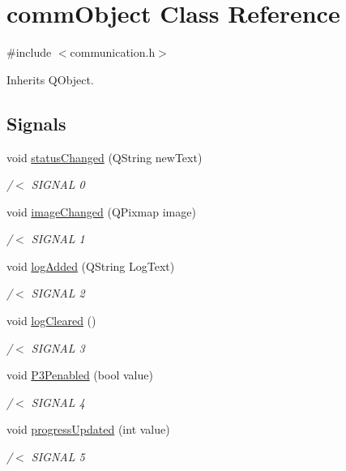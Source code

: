 \hypertarget{classcomm_object}{}\section{comm\+Object Class Reference}
\label{classcomm_object}


{\ttfamily \#include $<$communication.\+h$>$}



Inherits Q\+Object.

\subsection*{Signals}
\begin{DoxyCompactItemize}
\item 
void \hyperlink{classcomm_object_adccf5b5946d35d5cf6d76f367f93e335}{status\+Changed} (Q\+String new\+Text)
\begin{DoxyCompactList}\small\item\em /$<$ S\+I\+G\+N\+AL 0 \end{DoxyCompactList}\item 
void \hyperlink{classcomm_object_a3828eab6be234f6216a6f80a6a82e41e}{image\+Changed} (Q\+Pixmap image)
\begin{DoxyCompactList}\small\item\em /$<$ S\+I\+G\+N\+AL 1 \end{DoxyCompactList}\item 
void \hyperlink{classcomm_object_a72620fe1bac16309baf6d148644edaf9}{log\+Added} (Q\+String Log\+Text)
\begin{DoxyCompactList}\small\item\em /$<$ S\+I\+G\+N\+AL 2 \end{DoxyCompactList}\item 
void \hyperlink{classcomm_object_af2304085624c26230e9d930d616e3e19}{log\+Cleared} ()
\begin{DoxyCompactList}\small\item\em /$<$ S\+I\+G\+N\+AL 3 \end{DoxyCompactList}\item 
void \hyperlink{classcomm_object_af369de87a7f2c9b7170223bedd6c08d9}{P3\+Penabled} (bool value)
\begin{DoxyCompactList}\small\item\em /$<$ S\+I\+G\+N\+AL 4 \end{DoxyCompactList}\item 
void \hyperlink{classcomm_object_a6039d306f25a6b46c78942edf9cee662}{progress\+Updated} (int value)
\begin{DoxyCompactList}\small\item\em /$<$ S\+I\+G\+N\+AL 5 \end{DoxyCompactList}\end{DoxyCompactItemize}
